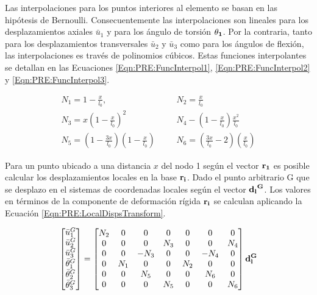 Las interpolaciones para los puntos interiores al elemento se basan en las hipótesis de Bernoulli. Consecuentemente las interpolaciones son lineales para los desplazamientos axiales $\bar{u}_1$ y para los ángulo de torsión $\bf{\theta_1}$. Por la contraria, tanto para los desplazamientos transversales $\bar{u}_2$ y $\bar{u}_3$  como para los ángulos de flexión, las interpolaciones es través de polinomios cúbicos. Estas funciones interpolantes se detallan en las Ecuaciones \eqref{Eqn:PRE:FuncInterpol1}, \eqref{Eqn:PRE:FuncInterpol2} y \eqref{Eqn:PRE:FuncInterpol3}.

\begin{eqnarray}
		\label{Eqn:PRE:FuncInterpol1}
 		N_1 = 1 - \frac{x}{l_0},   		&~~~~& 	N_2= \frac{x}{l_0}\\
 		\label{Eqn:PRE:FuncInterpol2}
 		N_3 = x\left(1 - \frac{x}{l_0}\right)^2 	&~~~~&  N_4 - \left( 1 - \frac{x}{l_0} \right ) \frac{x^2}{l_0} \\
 		\label{Eqn:PRE:FuncInterpol3}
 		N_5 = \left(1 - \frac{3x}{l_0}\right) \left(1 - \frac{x}{l_0}\right) 	&~~~~&  N_6 =\left( \frac{3x}{l_0}-2\right) \left(\frac{x}{l_0}\right)
\end{eqnarray}

Para un punto ubicado a una distancia $x$ del nodo 1 según el vector $\bf{r_1}$ es posible calcular los desplazamientos locales en la base $\bf{r_i}$. Dado el punto arbitrario G que se desplazo en el sistemas de coordenadas locales según el vector $\bf{d_l}^G$. Los valores en términos de la componente de deformación rígida $\bf{r_i}$ se calculan aplicando la Ecuación \ref{Eqn:PRE:LocalDispsTransform}.

\begin{equation}\label{Eqn:PRE:LocalDispsTransform}
	\begin{bmatrix}
		\bar{u}_1^G\\
		\bar{u}_2^G\\
		\bar{u}_3^G\\
		 \bar{\theta}_1^G\\
		 \bar{\theta}_2^G\\
		 \bar{\theta}_3^G\\
	\end{bmatrix}
=
\begin{bmatrix}
	N_2 &0  & 0 & 0 & 0 & 0 & 0   \\ 
	0 & 0 & 0 & N_3 & 0 &0  &N_4  \\ 
	0& 0 &-N_3  & 0 &0  & -N_4 &0 \\ 
	0 & N_1 & 0 & 0 &N_2  & 0 &0   \\ 
	0&0  & N_5 & 0 & 0 & N_6 &0   \\ 
	0 & 0 & 0 & N_5 & 0 & 0 & N_6   \\
\end{bmatrix} \bf{d_l^G}
\end{equation}

